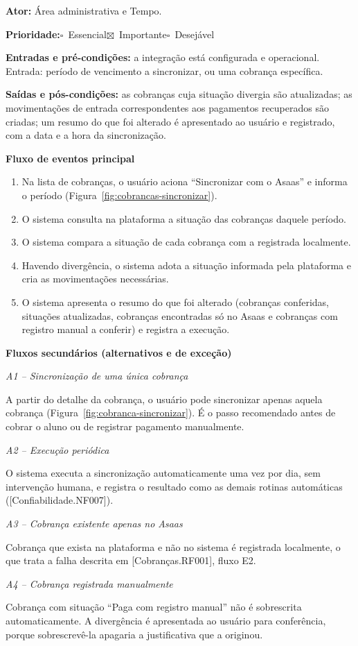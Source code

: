 \documentclass[11pt,a4paper,oneside]{report}
\newcommand{\marcado}{$\boxtimes$}
\newcommand{\vazio}{$\square$}
\newcommand{\prioI}{\par\textbf{Prioridade:}\quad\vazio~Essencial\quad\marcado~Importante\quad\vazio~Desejável\par}
\newcommand{\ator}[1]{\par\textbf{Ator:} #1\par}
\newcommand{\entradas}{\textbf{Entradas e pré-condições:} }
\newcommand{\saidas}{\par\textbf{Saídas e pós-condições:} }
\newcommand{\fluxoprincipal}{\par\textbf{Fluxo de eventos principal}\par}
\newcommand{\fluxossecundarios}{\par\textbf{Fluxos secundários (alternativos e de exceção)}\par}
\newcommand{\fluxo}[2]{\par\smallskip\textit{#1 -- #2}\par}
\begin{document}
\ator{Área administrativa e Tempo.}
\prioI

\entradas a integração está configurada e operacional. Entrada: período de vencimento a
sincronizar, ou uma cobrança específica.

\saidas as cobranças cuja situação divergia são atualizadas; as movimentações de entrada
correspondentes aos pagamentos recuperados são criadas; um resumo do que foi alterado é
apresentado ao usuário e registrado, com a data e a hora da sincronização.

\fluxoprincipal
\begin{enumerate}
  \item Na lista de cobranças, o usuário aciona ``Sincronizar com o Asaas'' e informa o período
        (Figura~\ref{fig:cobrancas-sincronizar}).
  \item O sistema consulta na plataforma a situação das cobranças daquele período.
  \item O sistema compara a situação de cada cobrança com a registrada localmente.
  \item Havendo divergência, o sistema adota a situação informada pela plataforma e cria as
        movimentações necessárias.
  \item O sistema apresenta o resumo do que foi alterado (cobranças conferidas, situações
        atualizadas, cobranças encontradas só no Asaas e cobranças com registro manual a conferir)
        e registra a execução.
\end{enumerate}

\fluxossecundarios

\fluxo{A1}{Sincronização de uma única cobrança}
A partir do detalhe da cobrança, o usuário pode sincronizar apenas aquela cobrança
(Figura~\ref{fig:cobranca-sincronizar}). É o passo recomendado antes de cobrar o aluno ou de
registrar pagamento manualmente.

\fluxo{A2}{Execução periódica}
O sistema executa a sincronização automaticamente uma vez por dia, sem intervenção humana, e
registra o resultado como as demais rotinas automáticas ([Confiabilidade.NF007]).

\fluxo{A3}{Cobrança existente apenas no Asaas}
Cobrança que exista na plataforma e não no sistema é registrada localmente, o que trata a falha
descrita em [Cobranças.RF001], fluxo E2.

\fluxo{A4}{Cobrança registrada manualmente}
Cobrança com situação ``Paga com registro manual'' não é sobrescrita automaticamente. A divergência
é apresentada ao usuário para conferência, porque sobrescrevê-la apagaria a justificativa que a
originou.
\end{document}
